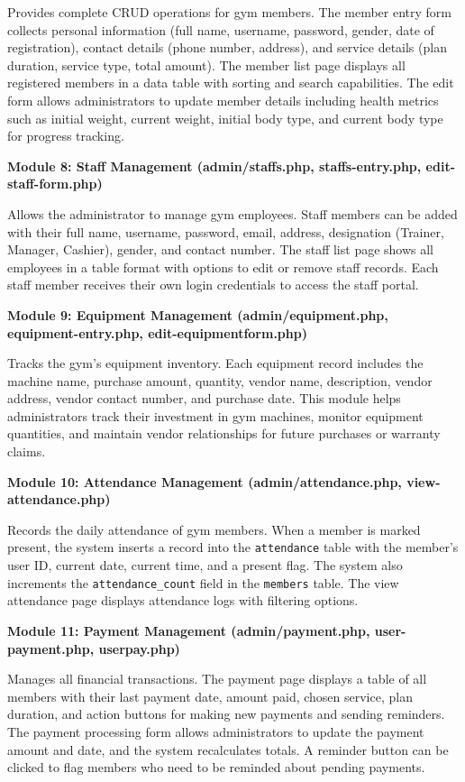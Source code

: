 \documentclass[12pt,a4paper]{report}
\begin{document}
Provides complete CRUD operations for gym members. The member entry form collects personal information (full name, username, password, gender, date of registration), contact details (phone number, address), and service details (plan duration, service type, total amount). The member list page displays all registered members in a data table with sorting and search capabilities. The edit form allows administrators to update member details including health metrics such as initial weight, current weight, initial body type, and current body type for progress tracking.

\textbf{Module 8: Staff Management (admin/staffs.php, staffs-entry.php, edit-staff-form.php)}

Allows the administrator to manage gym employees. Staff members can be added with their full name, username, password, email, address, designation (Trainer, Manager, Cashier), gender, and contact number. The staff list page shows all employees in a table format with options to edit or remove staff records. Each staff member receives their own login credentials to access the staff portal.

\textbf{Module 9: Equipment Management (admin/equipment.php, equipment-entry.php, edit-equipmentform.php)}

Tracks the gym's equipment inventory. Each equipment record includes the machine name, purchase amount, quantity, vendor name, description, vendor address, vendor contact number, and purchase date. This module helps administrators track their investment in gym machines, monitor equipment quantities, and maintain vendor relationships for future purchases or warranty claims.

\textbf{Module 10: Attendance Management (admin/attendance.php, view-attendance.php)}

Records the daily attendance of gym members. When a member is marked present, the system inserts a record into the \texttt{attendance} table with the member's user ID, current date, current time, and a present flag. The system also increments the \texttt{attendance\_count} field in the \texttt{members} table. The view attendance page displays attendance logs with filtering options.

\textbf{Module 11: Payment Management (admin/payment.php, user-payment.php, userpay.php)}

Manages all financial transactions. The payment page displays a table of all members with their last payment date, amount paid, chosen service, plan duration, and action buttons for making new payments and sending reminders. The payment processing form allows administrators to update the payment amount and date, and the system recalculates totals. A reminder button can be clicked to flag members who need to be reminded about pending payments.
\end{document}
